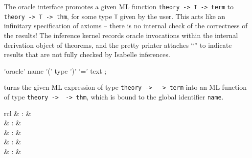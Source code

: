 \begin{isabellebody}
\begin{isamarkuptext}
  The oracle interface promotes a given ML function \verb|theory -> T -> term| to \verb|theory -> T -> thm|, for some
  type \verb|T| given by the user.  This acts like an infinitary
  specification of axioms -- there is no internal check of the
  correctness of the results!  The inference kernel records oracle
  invocations within the internal derivation object of theorems, and
  the pretty printer attaches ``\isa{{\isachardoublequote}{\isacharbrackleft}{\isacharbang}{\isacharbrackright}{\isachardoublequote}}'' to indicate results
  that are not fully checked by Isabelle inferences.

  \begin{rail}
    'oracle' name '(' type ')' '=' text
    ;
  \end{rail}

  \begin{descr}

  \item [\hyperlink{command.oracle}{\mbox{\isa{\isacommand{oracle}}}}~\isa{{\isachardoublequote}name\ {\isacharparenleft}type{\isacharparenright}\ {\isacharequal}\ text{\isachardoublequote}}] turns the
  given ML expression  of type
  \verb|theory ->|~~\verb|-> term| into an
  ML function of type
  \verb|theory ->|~~\verb|-> thm|, which is
  bound to the global identifier \verb|name|.

  \end{descr}%
\end{isamarkuptext}%
\isamarkuptrue%
%
\isamarkuptrue%
%
\isamarkuptrue%
%
\begin{isamarkuptext}%
\begin{matharray}{rcl}
    \hypertarget{command.sect}{\hyperlink{command.sect}{\mbox{}}} & : &  \\
    \hypertarget{command.subsect}{\hyperlink{command.subsect}{\mbox{}}} & : &  \\
    \hypertarget{command.subsubsect}{\hyperlink{command.subsubsect}{\mbox{}}} & : &  \\
    \hypertarget{command.txt}{\hyperlink{command.txt}{\mbox{}}} & : &  \\
    \hypertarget{command.txt-raw}{\hyperlink{command.txt-raw}{\mbox{}}} & : &  \\
  \end{matharray}


\end{isamarkuptext}
\end{isabellebody}
